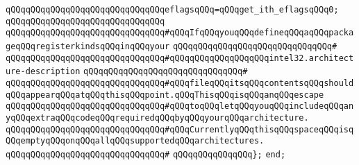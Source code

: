 \verb|qQQqqQQqqQQqqQQqqQQqqQQqqQQqqQQqeflagsqQQq=qQQqget_ith_eflagsqQQq0;|\newline
\verb|qQQqqQQqqQQqqQQqqQQqqQQqqQQqqQQq|\newline
\verb|qQQqqQQqqQQqqQQqqQQqqQQqqQQqqQQq#qQQqIfqQQqyouqQQqdefineqQQqaqQQqpackageqQQqregisterkindsqQQqinqQQqyour|\newline
\verb|qQQqqQQqqQQqqQQqqQQqqQQqqQQqqQQq#|\newline
\verb|qQQqqQQqqQQqqQQqqQQqqQQqqQQqqQQq#qQQqqQQqqQQqqQQqqQQqintel32.architecture-description|\newline
\verb|qQQqqQQqqQQqqQQqqQQqqQQqqQQqqQQq#|\newline
\verb|qQQqqQQqqQQqqQQqqQQqqQQqqQQqqQQq#qQQqfileqQQqitsqQQqcontentsqQQqshouldqQQqappearqQQqatqQQqthisqQQqpoint.qQQqThisqQQqisqQQqanqQQqescape|\newline
\verb|qQQqqQQqqQQqqQQqqQQqqQQqqQQqqQQq#qQQqtoqQQqletqQQqyouqQQqincludeqQQqanyqQQqextraqQQqcodeqQQqrequiredqQQqbyqQQqyourqQQqarchitecture.|\newline
\verb|qQQqqQQqqQQqqQQqqQQqqQQqqQQqqQQq#qQQqCurrentlyqQQqthisqQQqspaceqQQqisqQQqemptyqQQqonqQQqallqQQqsupportedqQQqarchitectures.|\newline
\verb|qQQqqQQqqQQqqQQqqQQqqQQqqQQqqQQq#|\newline
\verb|qQQqqQQqqQQqqQQq};|\newline
\verb|end;|\newline
\newline

